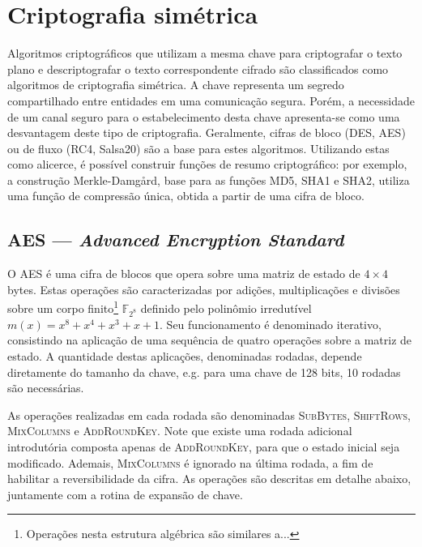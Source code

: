 \documentclass{article}
\begin{document}
\section{Criptografia simétrica}

Algoritmos criptográficos que utilizam a mesma chave para criptografar o
texto plano e descriptografar o texto correspondente cifrado são classificados
como algoritmos de criptografia simétrica. A chave representa um segredo
compartilhado entre entidades em uma comunicação segura. Porém, a necessidade
de um canal seguro para o estabelecimento desta chave apresenta-se como uma
desvantagem deste tipo de criptografia. Geralmente, cifras de bloco (DES, AES)
ou de fluxo (RC4, Salsa20) são a base para estes algoritmos. Utilizando estas
como alicerce, é possível construir funções de resumo criptográfico: por
exemplo, a construção Merkle-Damgård, base para as funções MD5, SHA1 e SHA2,
utiliza uma função de compressão única, obtida a partir de uma cifra de bloco.

\subsection{AES --- \emph{Advanced Encryption Standard}}

O AES é uma cifra de blocos que opera sobre uma matriz de estado de $4 \times 4$ bytes. Estas operações são caracterizadas por adições, multiplicações e divisões sobre um corpo finito\footnote{Operações nesta estrutura algébrica são similares a...}
$\mathbb{F}_{2^{8}}$ definido pelo polinômio irredutível $m(x) = x^{8} + x^{4} + x^{3} + x + 1$. Seu funcionamento é denominado
iterativo, consistindo na aplicação de uma sequência de quatro operações sobre a matriz de estado. A quantidade destas aplicações, denominadas rodadas, depende diretamente do tamanho da chave, e.g. para uma chave de 128 bits, 10 rodadas são necessárias.

As operações realizadas em cada rodada são denominadas \textsc{SubBytes}, \textsc{ShiftRows}, \textsc{MixColumns} e \textsc{AddRoundKey}. Note que existe uma rodada adicional introdutória
composta apenas de \textsc{AddRoundKey}, para que o estado inicial seja modificado. Ademais, \textsc{MixColumns} é ignorado na última rodada, a fim de habilitar a reversibilidade da cifra.
As operações são descritas em detalhe abaixo, juntamente com a rotina de expansão de chave.
\end{document}
